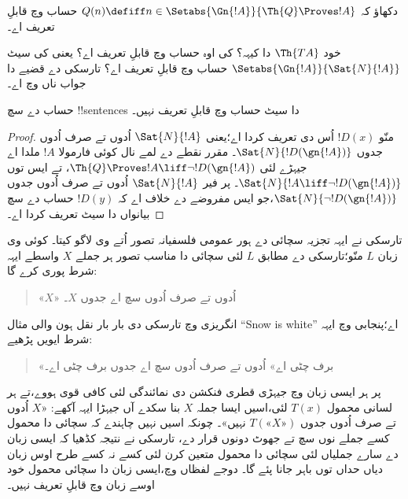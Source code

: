 \documentclass[../../../include/open-logic-section]{subfiles}
\begin{document}
\begin{prob}
دکھاؤ کہ $Q(n) \defiff n \in \Setabs{\Gn{!A}}{\Th{Q} \Proves !A}$
حساب وچ قابلِ تعریف اے۔
\end{prob}

خود $\Th{TA}$ دا کیہہ؟ کی اوہ حساب وچ قابلِ تعریف اے؟
یعنی کی سیٹ $\Setabs{\Gn{!A}}{\Sat{N}{!A}}$ حساب
وچ قابلِ تعریف اے؟ تارسکی دے قضیے دا جواب ناں وچ اے۔

\begin{thm}
حساب دے سچ !!{sentence}s دا سیٹ حساب وچ قابلِ تعریف
نہیں۔
\end{thm}

\begin{proof}
منّو $!D(x)$ اُس دی تعریف کردا اے؛یعنی
$\Sat{N}{!A}$ اُدوں تے صرف اُدوں جدوں
$\Sat{N}{!D(\gn{!A})}$۔ مقرر نقطے دے لمے نال کوئی
فارمولا $!A$ ملدا اے جیہڑے لئی
$\Th{Q} \Proves !A \liff \lnot !D(\gn{!A})$،
تے ایس توں $\Sat{N}{!A \liff \lnot !D(\gn{!A})}$۔
پر فیر $\Sat{N}{!A}$ اُدوں تے صرف اُدوں جدوں
$\Sat{N}{\lnot !D(\gn{!A})}$،جو ایس مفروضے دے
خلاف اے کہ $!D(y)$ حساب دے سچ بیانواں دا سیٹ تعریف
کردا اے۔
\end{proof}

تارسکی نے ایہہ تجزیہ سچائی دے ہور عمومی فلسفیانہ
تصور اُتے وی لاگو کیتا۔ کوئی وی زبان $L$ منّو؛تارسکی
دے مطابق $L$ لئی سچائی دا مناسب تصور ہر جملے $X$ واسطے
ایہہ شرط پوری کرے گا:
\begin{quote}
«$X$» اُدوں تے صرف اُدوں سچ اے جدوں $X$۔
\end{quote}
انگریزی وچ تارسکی دی بار بار نقل ہون والی مثال
“Snow is white” اے؛پنجابی وچ ایہہ شرط ایویں پڑھیے:
\begin{quote}
«برف چٹی اے» اُدوں تے صرف اُدوں سچ اے جدوں برف چٹی اے۔
\end{quote}
پر ہر ایسی زبان وچ جیہڑی قطری فنکشن دی نمائندگی لئی کافی
قوی ہووے،تے ہر لسانی محمول $T(x)$ لئی،اسیں ایسا جملہ
$X$ بنا سکدے آں جیہڑا ایہہ آکھے: «$X$ اُدوں تے صرف اُدوں جدوں
$T(\text{«$X$»})$ نہیں»۔ چونکہ اسیں نہیں چاہندے کہ
سچائی دا محمول کسے جملے نوں سچ تے جھوٹ دونوں قرار دے،
تارسکی نے نتیجہ کڈھیا کہ ایسی زبان دے سارے جملیاں لئی
سچائی دا محمول متعین کرن لئی کسے نہ کسے طرح اوس زبان
دیاں حداں توں باہر جانا پئے گا۔ دوجے لفظاں وچ،ایسی
زبان دا سچائی محمول خود اوسے زبان وچ قابلِ تعریف نہیں۔
\end{document}
